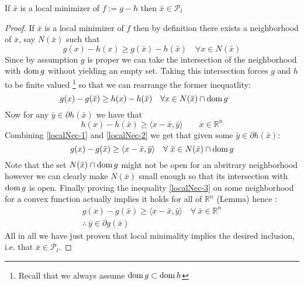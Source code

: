 \begin{theorem}
If $\bar x$ is a local minimizer of $f:=g-h$ then $\bar x \in \mathcal P_l$
\begin{proof}
If $\bar x$ is a local minimizer of $f$ then by definition there
exists a neighborhood of $\bar x$, say $N(\bar x)$ such
that 
%
\begin{equation}
	g(x)- h(x) \geq g(\bar x) - h(\bar x) \quad 
	\forall x\in N(\bar x)  
\end{equation}
\noindent Since by assumption $g$ is proper we can
take the intersection of the neighborhood with $\mathrm{dom} \, g$ without yielding an
empty set. Taking this intersection forces $g$ and $h$ to be finite valued
\footnote{Recall that we always assume $ \mathrm{dom} \, g \subset \mathrm{dom} \, h$}
so that we can rearrange the former inequatlity:
\begin{equation}
	g(x)- g(\bar x) \geq h( x) - h(\bar x) \quad 
	\forall x\in N(\bar x) \cap \mathrm{dom} \, g  \qquad 
	\label{localNec-1}
\end{equation}
\noindent Now for any $\bar y \in\partial h(\bar x)$ we have that 
\begin{equation}
	h(x)-h(\bar x) \geq \langle x-\bar x, \bar y\rangle 
	\qquad x\in\mathbb R^n
	\label{localNec-2}
\end{equation}
%
Combining \eqref{localNec-1} and \eqref{localNec-2} we get
that given some   $\bar y \in \partial h(\bar x)$:
%
\begin{equation}
	g(x)-g(\bar x)\geq \langle x-\bar x,\bar y\rangle \quad \forall \ 
	\bar x \in N(\bar x)\cap \ddom g 
	\label{localNec-3}
\end{equation}
Note that the set $N(\bar x) \cap \mathrm{dom} \, g$ might not be open for an abritrary
neighborhood however we can clearly make $N(\bar x)$ small enough so that its
intersection with $\mathrm{dom} \, g$ is open. Finally proving the inequality 
\eqref{localNec-3} on some neighborhood for a convex function actually
implies it holds for all of $\mathbb R^n$ (Lemma) hence :
\begin{gather*}
	g(x)-g(\bar x)\geq \langle x-\bar x,\bar y\rangle \quad \forall \ 
	\bar x \in \mathbb R^n\\
	\therefore \  \bar y \in\partial g(\bar x)
\end{gather*}
All in all we have just proven that local minimality implies the desired
inclusion, i.e. that  $\bar x \in \mathcal P_l$. 
\end{proof}
\end{theorem}
\clearpage

